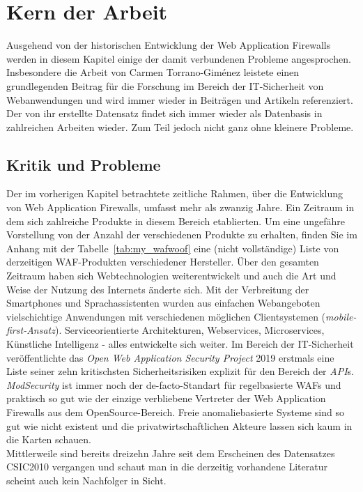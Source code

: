 \chapter{Kern der Arbeit}

Ausgehend von der historischen Entwicklung der Web Application Firewalls werden in diesem Kapitel einige der damit verbundenen Probleme angesprochen. Insbesondere die Arbeit von Carmen Torrano-Giménez leistete einen grundlegenden Beitrag für die Forschung im Bereich der IT-Sicherheit von Webanwendungen und wird immer wieder in Beiträgen und Artikeln referenziert. Der von ihr erstellte Datensatz findet sich immer wieder als Datenbasis in zahlreichen Arbeiten wieder. Zum Teil jedoch nicht ganz ohne kleinere Probleme. 

\section{Kritik und Probleme}
\label{sec:Probleme}

Der im vorherigen Kapitel betrachtete zeitliche Rahmen, über die Entwicklung von Web Application Firewalls, umfasst mehr als zwanzig Jahre. Ein Zeitraum in dem sich zahlreiche Produkte in diesem Bereich etablierten. Um eine ungefähre Vorstellung von der Anzahl der verschiedenen Produkte zu erhalten, finden Sie im Anhang mit der Tabelle~\ref{tab:my_wafwoof} eine (nicht vollständige) Liste von derzeitigen WAF-Produkten verschiedener Hersteller. Über den gesamten Zeitraum haben sich Webtechnologien weiterentwickelt und auch die Art und Weise der Nutzung des Internets änderte sich. Mit der Verbreitung der Smartphones und Sprachassistenten wurden aus einfachen Webangeboten vielschichtige Anwendungen mit verschiedenen möglichen Clientsystemen (\emph{mobile-first-Ansatz}). Serviceorientierte Architekturen, Webservices, Microservices, Künstliche Intelligenz - alles entwickelte sich weiter. Im Bereich der IT-Sicherheit veröffentlichte das \emph{Open Web Application Security Project} 2019 erstmals eine Liste seiner zehn kritischsten Sicherheitsrisiken explizit für den Bereich der \emph{API}s. \emph{ModSecurity} ist immer noch der de-facto-Standart für regelbasierte WAFs und praktisch so gut wie der einzige verbliebene Vertreter der Web Application Firewalls aus dem OpenSource-Bereich. Freie anomaliebasierte Systeme sind so gut wie nicht existent und die privatwirtschaftlichen Akteure lassen sich kaum in die Karten schauen. \\
Mittlerweile sind bereits dreizehn Jahre seit dem Erscheinen des Datensatzes CSIC2010 vergangen und schaut man in die derzeitig vorhandene Literatur scheint auch kein Nachfolger in Sicht. \\\\

